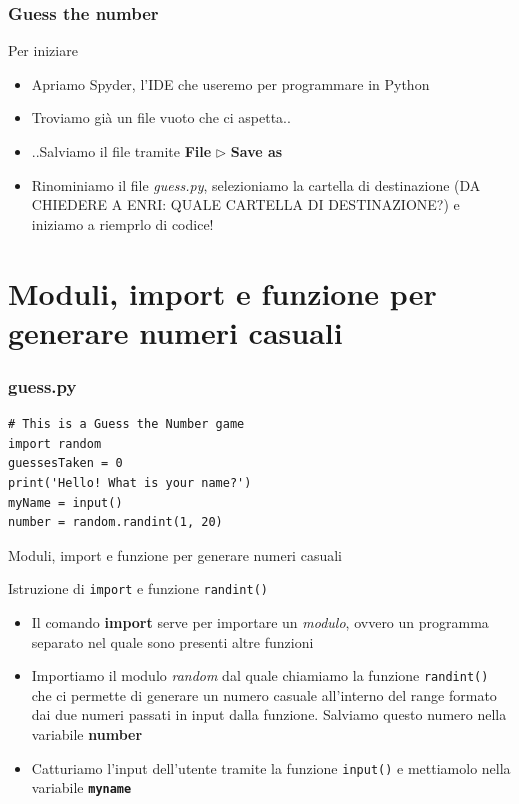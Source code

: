 \documentclass{beamer}
\begin{document}
\begin{frame}[fragile]
\frametitle{Guess the number}
\begin{block}{Per iniziare}
	\begin{itemize}
		\item Apriamo Spyder, l'IDE che useremo per programmare in Python
		\item Troviamo già un file vuoto che ci aspetta..
		\item ..Salviamo il file  tramite \textbf{File} $\rhd$ \textbf{Save as}
		\item Rinominiamo il file \textit{guess.py}, selezioniamo la cartella di destinazione (DA CHIEDERE A ENRI: QUALE CARTELLA DI DESTINAZIONE?) e iniziamo a riemprlo di codice!
	\end{itemize}
\end{block}
    
\end{frame}

\section{Moduli, import e funzione per generare numeri casuali}

\begin{frame}[fragile]
\frametitle{guess.py}
    \begin{lstlisting}
# This is a Guess the Number game
import random
guessesTaken = 0
print('Hello! What is your name?')
myName = input()
number = random.randint(1, 20)
    \end{lstlisting}
\end{frame}

\begin{frame}{Moduli, import e funzione per generare numeri casuali}
    \begin{block}{Istruzione di \texttt{import} e funzione \texttt{randint()}}
        \begin{itemize}
            \item Il comando \textbf{import} serve per importare un \textit{modulo}, ovvero un programma separato nel quale sono presenti altre funzioni
            \item Importiamo il modulo \textit{random} dal quale chiamiamo la funzione \texttt{randint()} che ci permette di generare un numero casuale all'interno del range formato dai due numeri passati in input dalla funzione. Salviamo questo numero nella variabile \textbf{\textrm{number}}
            \item Catturiamo l'input dell'utente tramite la funzione \texttt{input()} e mettiamolo nella variabile \textbf{\texttt{myname}}
        \end{itemize}
        
    \end{block}
\end{frame}
\end{document}
